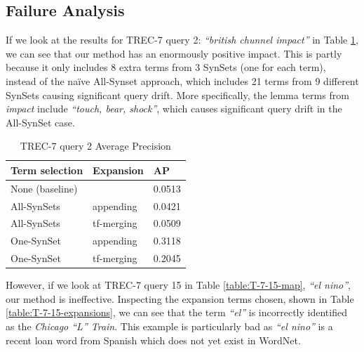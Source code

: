 \subsection{Failure Analysis}


If we look at the results for TREC-7 query 2: \textit{``british chunnel impact''} in Table \ref{table:T-7-2-map}, we can see that our method has an enormously positive impact. This is partly because it only includes 8 extra terms from 3 SynSets (one for each term), instead of the na{\"i}ve All-Synset approach, which includes 21 terms from 9 different SynSets causing significant query drift. More specifically, the lemma terms from \textit{impact} include \textit{``touch, bear, shock''}, which causes significant query drift in the All-SynSet case.

\begin{table}[h]
\centering
\begin{tabular}{|l|l|l|}
\hline
Term selection  & Expansion  & AP      \\ \hline
None (baseline) &            & 0.0513 \\
All-SynSets     & appending  & 0.0421 \\
All-SynSets     & tf-merging & 0.0509 \\
One-SynSet      & appending  & 0.3118 \\
One-SynSet      & tf-merging & 0.2045 \\ \hline
\end{tabular}
\caption{TREC-7 query 2 Average Precision}
\label{table:T-7-2-map}
\end{table}


However, if we look at TREC-7 query 15 in Table \ref{table:T-7-15-map}, \textit{``el nino''}, our method is ineffective. Inspecting the expansion terms chosen, shown in Table \ref{table:T-7-15-expansions}, we can see that the term \textit{``el''} is incorrectly identified as the \textit{Chicago ``L'' Train}. This example is particularly bad as \textit{``el nino''} is a recent loan word from Spanish which does not yet exist in WordNet.

